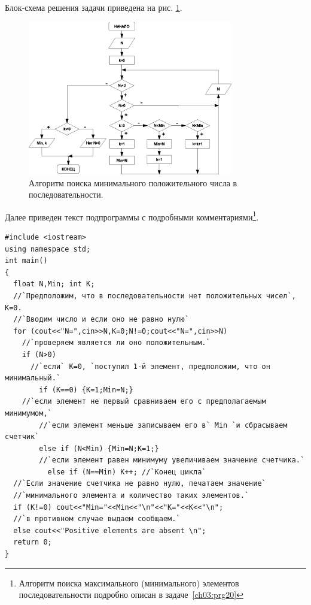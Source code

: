 Блок-схема решения задачи приведена на рис. \ref{ch03:refDrawing34}.
\begin{figure}[htb]
\begin{center}
\includegraphics[width=0.8\textwidth]{img/ris_3_35}
\caption{Алгоритм поиска минимального положительного числа в последовательности.}
\label{ch03:refDrawing34}
\end{center}
\end{figure}

Далее приведен текст подпрограммы с подробными комментариями\footnote{Алгоритм поиска максимального (минимального)
элементов последовательности подробно описан в задаче~\ref{ch03:prg20}}.

\begin{lstlisting}
#include <iostream>
using namespace std;
int main()
{
  float N,Min; int K;
  //`Предположим, что в последовательности нет положительных чисел`, K=0.
  //`Вводим число и если оно не равно нулю`
  for (cout<<"N=",cin>>N,K=0;N!=0;cout<<"N=",cin>>N)
    //`проверяем является ли оно положительным.`
    if (N>0)
      //`если` K=0, `поступил 1-й элемент, предположим, что он минимальный.`
        if (K==0) {K=1;Min=N;}
	//`если элемент не первый сравниваем его с предполагаемым минимумом,`
        //`если элемент меньше записываем его в` Min `и сбрасываем счетчик`
        else if (N<Min) {Min=N;K=1;}
        //`если элемент равен минимуму увеличиваем значение счетчика.`
          else if (N==Min) K++; //`Конец цикла`
  //`Если значение счетчика не равно нулю, печатаем значение`
  //`минимального элемента и количество таких элементов.`
  if (K!=0) cout<<"Min="<<Min<<"\n"<<"K="<<K<<"\n";
  //`в противном случае выдаем сообщаем.`
  else cout<<"Positive elements are absent \n";
  return 0;
}
\end{lstlisting}


